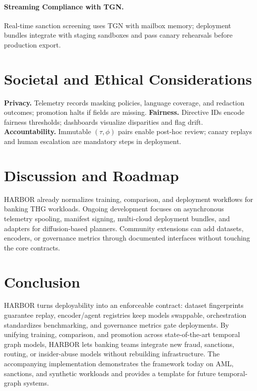 \documentclass[letterpaper]{article}
\begin{document}
\paragraph{Streaming Compliance with TGN.} Real-time sanction screening uses TGN with mailbox memory; deployment bundles integrate with staging sandboxes and pass canary rehearsals before production export.

\section{Societal and Ethical Considerations}
\textbf{Privacy.} Telemetry records masking policies, language coverage, and redaction outcomes; promotion halts if fields are missing.  
\textbf{Fairness.} Directive IDs encode fairness thresholds; dashboards visualize disparities and flag drift.  
\textbf{Accountability.} Immutable $(\tau,\phi)$ pairs enable post-hoc review; canary replays and human escalation are mandatory steps in deployment.

\section{Discussion and Roadmap}
HARBOR already normalizes training, comparison, and deployment workflows for banking THG workloads. Ongoing development focuses on asynchronous telemetry spooling, manifest signing, multi-cloud deployment bundles, and adapters for diffusion-based planners. Community extensions can add datasets, encoders, or governance metrics through documented interfaces without touching the core contracts.

\section{Conclusion}
\textsc{HARBOR} turns deployability into an enforceable contract: dataset fingerprints guarantee replay, encoder/agent registries keep models swappable, orchestration standardizes benchmarking, and governance metrics gate deployments. By unifying training, comparison, and promotion across state-of-the-art temporal graph models, \textsc{HARBOR} lets banking teams integrate new fraud, sanctions, routing, or insider-abuse models without rebuilding infrastructure. The accompanying implementation demonstrates the framework today on AML, sanctions, and synthetic workloads and provides a template for future temporal-graph systems.



\end{document}
